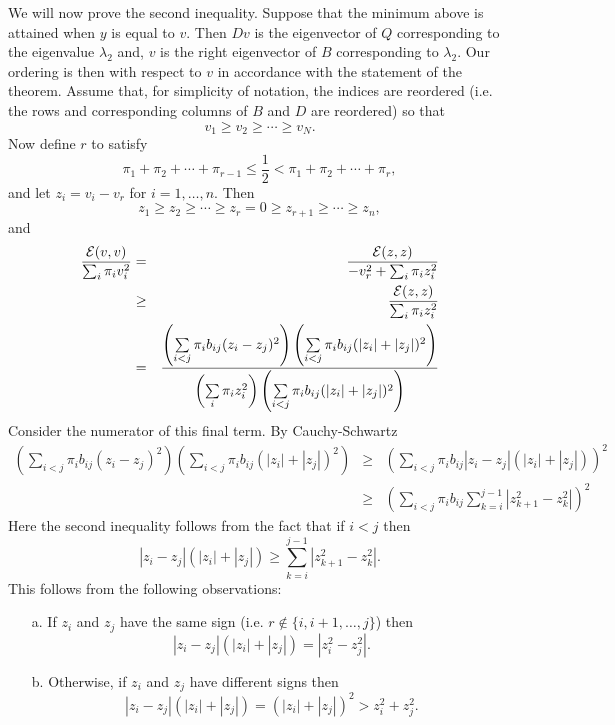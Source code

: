 \documentclass{book}
\numberwithin{exercise}{chapter}
\begin{document}
We will now prove the second inequality.
Suppose that the minimum above is attained when $y$ is equal to $v$.
Then $Dv$ is the eigenvector of $Q$ corresponding to the eigenvalue $\lambda_2$
and, $v$ is the right eigenvector of $B$ corresponding to $\lambda_2$. Our
ordering is then with respect to $v$ in accordance with the statement of
the theorem. Assume that, for simplicity of notation, the indices are reordered
(i.e. the rows and corresponding columns of $B$ and $D$ are reordered) so that
\[
v_1\geq v_2\geq \cdots \ge v_N.
\]
Now define $r$ to satisfy
\[
\pi_1+\pi_2+\cdots +\pi_{r-1}\leq \frac{1}{2} < \pi_1+\pi_2+\cdots +\pi_{r},
\]
and let $z_i=v_i-v_r$ for $i=1,\ldots,n$. Then
\[
z_1\geq z_2\geq \cdots \geq z_r=0\geq z_{r+1}\geq \cdots \geq z_n,
\] and
\begin{eqnarray*}
\frac{{\mathcal E}(v,v)}{\sum_i \pi_i v_i^2}
& = & \frac{{\mathcal E}(z,z)}{-v_r^2+\sum_i \pi_i z_i^2}\\
& \geq &\frac{{\mathcal E}(z,z)}{\sum_i \pi_i z_i^2}\\
& = &
\frac{\left(\sum\limits_{i<j}\pi_ib_{ij}(z_i-z_j)^2\right)
\left(\sum\limits_{i<j}\pi_ib_{ij}(|z_i|+|z_j|)^2\right)}{
\left(\sum\limits_i \pi_i z_i^2\right)
\left(\sum\limits_{i<j}\pi_ib_{ij}(|z_i|+|z_j|)^2\right)}
\end{eqnarray*}
Consider the numerator of this final term. By Cauchy-Schwartz
\begin{eqnarray}
\left(\sum\limits_{i<j}\pi_ib_{ij}(z_i-z_j)^2\right)
	\left(\sum\limits_{i<j}\pi_ib_{ij}(|z_i|+|z_j|)^2\right)
&\geq &\left(\sum_{i<j}\pi_ib_{ij}|z_i-z_j|(|z_i|+|z_j|)\right)^2 \nonumber \\
&\geq &\left(\sum_{i<j}\pi_ib_{ij}\sum_{k=i}^{j-1}|z_{k+1}^2-z_k^2|\right)^2 \label{technical}
\end{eqnarray}
Here the second inequality follows from the fact that if $i<j$ then
\[
|z_i-z_j|(|z_i|+|z_j|) \geq \sum_{k=i}^{j-1}|z_{k+1}^2-z_k^2|.
\]
This
follows from the following observations:
\begin{itemize}
\item[a.] If $z_i$ and $z_j$ have the same sign (i.e. $r\not\in \{i,i+1,\ldots,j\}$) then
\[
|z_i-z_j|(|z_i|+|z_j|)=|z_i^2-z_j^2|.
\]
\item[b.] Otherwise, if $z_i$ and $z_j$ have different signs then
\[
|z_i-z_j|(|z_i|+|z_j|)= (|z_i|+|z_j|)^2 > z_i^2+z_j^2.
\]
\end{itemize}
\end{document}
